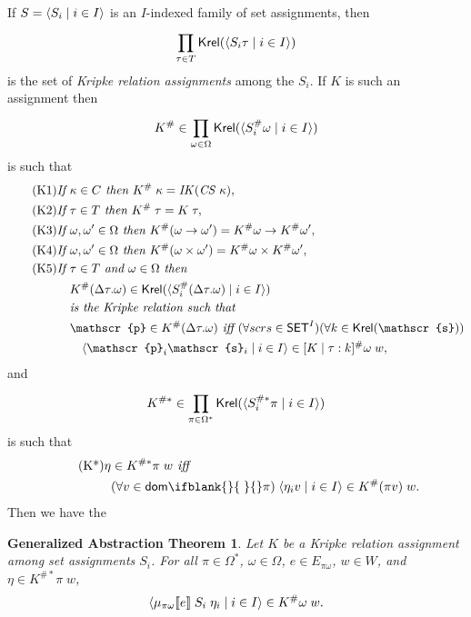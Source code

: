 \documentclass[sigplan,screen,nonacm,balance=false]{acmart}
\theoremstyle{plain}
\DeclarePairedDelimiter{\pair}{\langle}{\rangle}
\DeclarePairedDelimiter{\interp}{\llbracket}{\rrbracket}
\newcommand{\dom}[1]{\mathsf{dom}\ifblank{#1}{\;}{#1}}
\newcommand{\SET}{\mathsf{SET}}
\newcommand{\Krel}{\mathsf{Krel}}
\newcommand{\CS}{\mathit{CS}}
\newcommand{\IK}{\mathit{IK}}
\newcommand{\scrs}{\mathscr{s}}
\newcommand{\scrp}{\mathscr{p}}
\begin{document}
If $S = \pair{S_i \mid i \in I}$ is an $I$-indexed family of set assignments, then
%
\begin{equation*}
  \prod_{\tau \in T}^{} \Krel(\pair{S_i \tau \mid i \in I})
\end{equation*}
%
is the set of \emph{Kripke relation assignments} among the $S_i$.
If $K$ is such an assignment then
%
\begin{equation*}
  K^\# \in \prod_{\omega \in \Omega}^{} \Krel(\pair{S_i^\# \omega \mid i \in I})
\end{equation*}
%
is such that
%
\begin{align*}
  \tag{K1}
  \textit{If } & \kappa \in C \textit{ then } K^\# \; \kappa = \IK(\CS \; \kappa), \\
  \tag{K2}
  \textit{If } & \tau \in T \textit{ then } K^\# \; \tau = K \; \tau, \\
  \tag{K3}
  \textit{If } & \omega, \omega' \in \Omega \textit{ then } K^\#(\omega \to \omega') = K^\# \omega \to K^\# \omega', \\
  \tag{K4}
  \textit{If } & \omega, \omega' \in \Omega \textit{ then } K^\#(\omega \times \omega') = K^\# \omega \times K^\# \omega', \\
  \tag{K5}
  \textit{If } & \tau \in T \textit{ and } \omega \in \Omega \textit{ then } \\
  & K^\#(\Delta \tau. \omega) \in \Krel(\pair{S_i^\#(\Delta \tau. \omega) \mid i \in I}) \\
  & \textit{is the Kripke relation such that} \\
  & \scrp \in K^\#(\Delta \tau. \omega) \textit{ iff } (\forall scrs \in \SET^I) (\forall k \in \Krel(\scrs)) \\
  & \quad \pair{\scrp_i \scrs_i \mid i \in I} \in [K \mid \tau: k]^\# \omega \; w,
\end{align*}
%
and
%
\begin{equation*}
  K^{\#*} \in \prod_{\pi \in \Omega^*}^{} \Krel(\pair{S_i^{\#*} \pi \mid i \in I})
\end{equation*}
is such that
%
\begin{align*}\tag{K*}
  \eta & \in K^{\#*} \pi \; w \textit{ iff } \\
  & (\forall v \in \dom{} \pi) \; \pair{\eta_i v \mid i \in I} \in K^\#(\pi v) \; w.
\end{align*}
%
Then we have the

\newtheorem*{genabs}{Generalized Abstraction Theorem}
\begin{genabs}
  Let $K$ be a Kripke relation assignment among set assignments $S_i$.
  For all $\pi \in \Omega^*$, $\omega \in \Omega$, $e \in E_{\pi \omega}$, $w \in W$, and $\eta \in K^{\#*} \pi \; w$,
  \begin{equation*}
    \pair{\mu_{\pi \omega} \interp{e} \; S_i \; \eta_i \mid i \in I} \in K^\# \omega \; w.
  \end{equation*}
\end{genabs}
\end{document}
